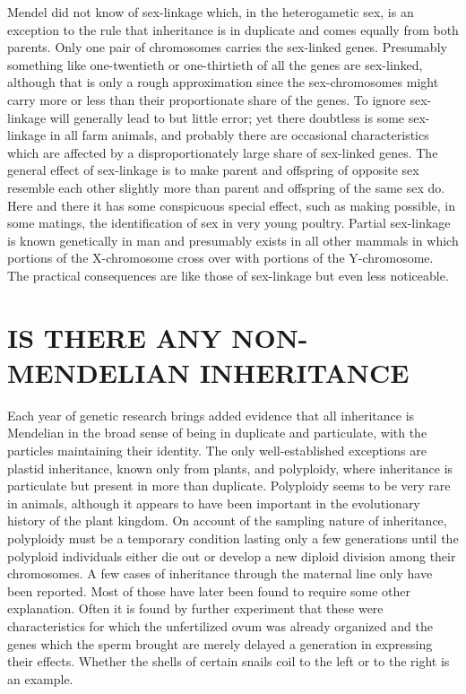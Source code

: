 Mendel did not know of sex-linkage which, in the heterogametic sex, is an exception to the rule that
inheritance is in duplicate and comes equally from both parents. Only one pair of chromosomes carries
the sex-linked genes. Presumably something like one-twentieth or one-thirtieth of all the genes are
sex-linked, although that is only a rough approximation since the sex-chromosomes might carry more or
less than their proportionate share of the genes. To ignore sex-linkage will generally lead to but
little error; yet there doubtless is some sex-linkage in all farm animals, and probably there are
occasional characteristics which are affected by a disproportionately large share of sex-linked
genes. The general effect of sex-linkage is to make parent and offspring of opposite sex resemble
each other slightly more than parent and offspring of the same sex do. Here and there it has some
conspicuous special effect, such as making possible, in some matings, the identification of sex in
very young poultry. Partial sex-linkage is known genetically in man and presumably exists in all other
mammals in which portions of the X-chromosome cross over with portions of the Y-chromosome. The
practical consequences are like those of sex-linkage but even less noticeable.

\section*{IS THERE ANY NON-MENDELIAN INHERITANCE}

Each year of genetic research brings added evidence that all inheritance is Mendelian in the broad
sense of being in duplicate and particulate, with the particles maintaining their identity. The only
well-established exceptions are plastid inheritance, known only from plants, and polyploidy, where
inheritance is particulate but present in more than duplicate. Polyploidy seems to be very rare in
animals, although it appears to have been important in the evolutionary history of the plant kingdom.
On account of the sampling nature of inheritance, polyploidy must be a temporary condition lasting only
a few generations until the polyploid individuals either die out or develop a new diploid division
among their chromosomes. A few cases of inheritance through the maternal line only have been reported.
Most of those have later been found to require some other explanation. Often it is found by further
experiment that these were characteristics for which the unfertilized ovum was already organized and the
genes which the sperm brought are merely delayed a generation in expressing their effects. Whether the
shells of certain snails coil to the left or to the right is an example.

